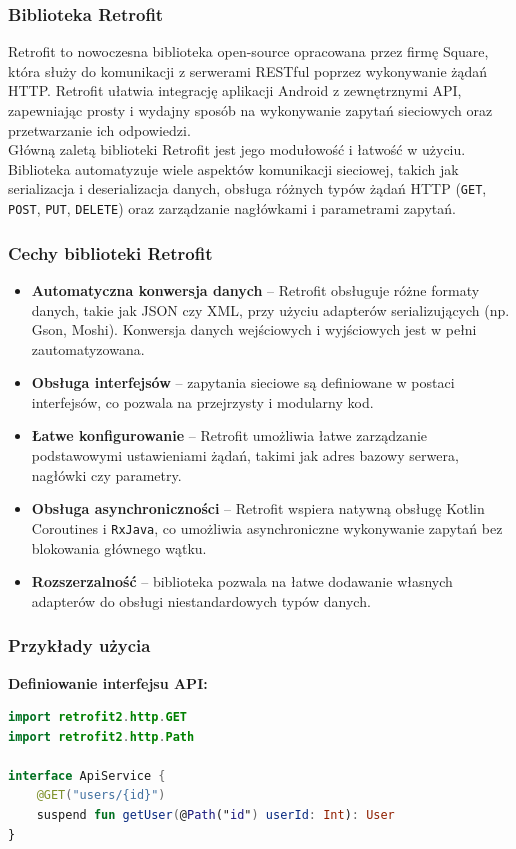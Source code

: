 \documentclass[12pt]{article}
\begin{document}
\subsubsection{Biblioteka Retrofit}
Retrofit to nowoczesna biblioteka open-source opracowana przez firmę Square, która służy do komunikacji z serwerami RESTful poprzez wykonywanie żądań HTTP.
Retrofit ułatwia integrację aplikacji Android z zewnętrznymi API, zapewniając prosty i wydajny sposób na wykonywanie zapytań sieciowych oraz przetwarzanie ich odpowiedzi.\\
Główną zaletą biblioteki Retrofit jest jego modułowość i łatwość w użyciu. Biblioteka automatyzuje wiele aspektów komunikacji sieciowej, takich jak serializacja
i deserializacja danych, obsługa różnych typów żądań HTTP (\texttt{GET}, \texttt{POST}, \texttt{PUT}, \texttt{DELETE}) oraz zarządzanie nagłówkami i parametrami zapytań.

\subsubsection*{Cechy biblioteki Retrofit}
\begin{itemize}
    \item \textbf{Automatyczna konwersja danych} – Retrofit obsługuje różne formaty danych, takie jak JSON czy XML, przy użyciu adapterów serializujących (np. Gson, Moshi). Konwersja danych wejściowych i wyjściowych jest w pełni zautomatyzowana.
    \item \textbf{Obsługa interfejsów} – zapytania sieciowe są definiowane w postaci interfejsów, co pozwala na przejrzysty i modularny kod.
    \item \textbf{Łatwe konfigurowanie} – Retrofit umożliwia łatwe zarządzanie podstawowymi ustawieniami żądań, takimi jak adres bazowy serwera, nagłówki czy parametry.
    \item \textbf{Obsługa asynchroniczności} – Retrofit wspiera natywną obsługę Kotlin Coroutines i \texttt{RxJava}, co umożliwia asynchroniczne wykonywanie zapytań bez blokowania głównego wątku.
    \item \textbf{Rozszerzalność} – biblioteka pozwala na łatwe dodawanie własnych adapterów do obsługi niestandardowych typów danych.
\end{itemize}

\subsubsection*{Przykłady użycia}
\textbf{Definiowanie interfejsu API:}
\begin{lstlisting}[language=Kotlin]
import retrofit2.http.GET
import retrofit2.http.Path

interface ApiService {
	@GET("users/{id}")
	suspend fun getUser(@Path("id") userId: Int): User
}
\end{lstlisting}
\end{document}
